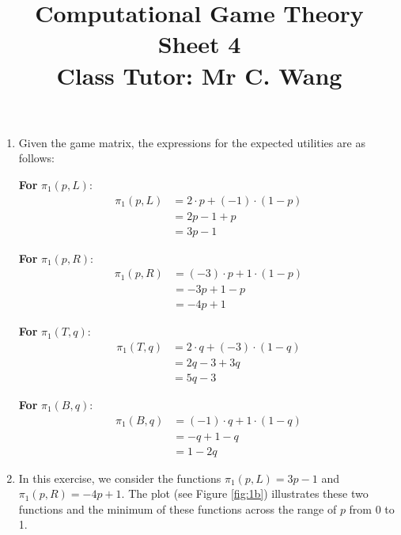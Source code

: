 \documentclass[a4paper]{article}
\title{Computational Game Theory \\ Sheet 4 \\
Class Tutor: Mr C. Wang}
\begin{document}
\maketitle
\begin{exercise}{1}
\end{exercise}
\begin{enumerate}[label=(\alph*)]
  \item Given the game matrix, the expressions for the expected utilities are as follows:

    \textbf{For} \(\pi_1(p, L)\):
    \begin{align*}
      \pi_1(p, L) &= 2 \cdot p + (-1) \cdot (1-p) \\
                  &= 2p - 1 + p \\
                  &= 3p - 1
    \end{align*}

    \textbf{For} \(\pi_1(p, R)\):
    \begin{align*}
      \pi_1(p, R) &= (-3) \cdot p + 1 \cdot (1-p) \\
                  &= -3p + 1 - p \\
                  &= -4p + 1
    \end{align*}

    \textbf{For} \(\pi_1(T, q)\):
    \begin{align*}
      \pi_1(T, q) &= 2 \cdot q + (-3) \cdot (1-q) \\
                  &= 2q - 3 + 3q \\
                  &= 5q - 3
    \end{align*}

    \textbf{For} \(\pi_1(B, q)\):
    \begin{align*}
      \pi_1(B, q) &= (-1) \cdot q + 1 \cdot (1-q) \\
                  &= -q + 1 - q \\
                  &= 1 - 2q
    \end{align*}

  \item

    In this exercise, we consider the functions $\pi_1(p, L) = 3p - 1$ and $\pi_1(p, R) = -4p + 1$. The plot (see Figure \ref{fig:1b}) illustrates these two functions and the minimum of these functions across the range of $p$ from 0 to 1.


\end{enumerate}
\end{document}
